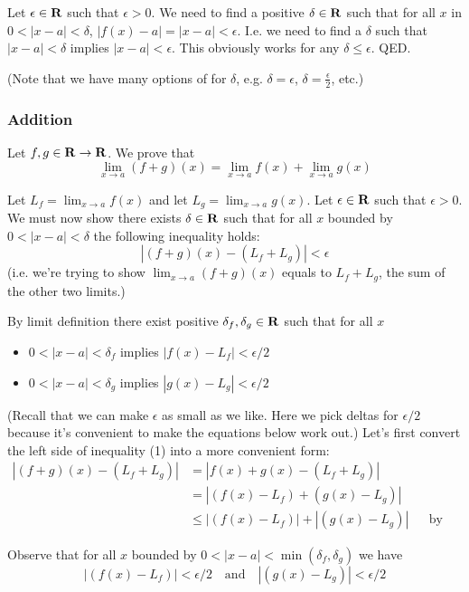 \vs

Let $\epsilon\in\mathbf{R}$ such that $\epsilon>0$. We need to find a positive $\delta\in\mathbf{R}$ such that for all $x$ in $0<|x-a|<\delta$, $|f(x)-a|=|x-a|<\epsilon$. I.e. we need to find a $\delta$ such that $|x-a|<\delta$ implies $|x-a|<\epsilon$. This obviously works for any $\delta\leq\epsilon$. QED.

\vs

(Note that we have many options of for $\delta$, e.g. $\delta=\epsilon$, $\delta=\frac{\epsilon}{2}$, etc.)

\subsubsection{Addition}
Let $f,g\in\mathbf{R}\to\mathbf{R}$. We prove that
\[\lim_{x\to a}(f+g)(x)=\lim_{x\to a}f(x)+\lim_{x\to a}g(x)\]

Let $L_f=\lim_{x\to a}f(x)$ and let $L_g=\lim_{x\to a}g(x)$. Let $\epsilon\in\mathbf{R}$ such that $\epsilon>0$. We must now show there exists $\delta\in\mathbf{R}$ such that for all $x$ bounded by $0<|x-a|<\delta$ the following inequality holds:
\begin{equation}
|(f+g)(x)-(L_f+L_g)|<\epsilon    
\end{equation}
(i.e. we're trying to show $\lim_{x\to a}(f+g)(x)$ equals to $L_f+L_g$, the sum of the other two limits.)

\vs

By limit definition there exist positive $\delta_f, \delta_g\in\mathbf{R}$ such that for all $x$
\begin{itemize}
    \item $0<|x-a|<\delta_f$ implies $|f(x)-L_f|<\epsilon/2$
    \item $0<|x-a|<\delta_g$ implies $|g(x)-L_g|<\epsilon/2$
\end{itemize}
(Recall that we can make $\epsilon$ as small as we like. Here we pick deltas for $\epsilon/2$ because it's convenient to make the equations below work out.) Let's first convert the left side of inequality (1) into a more convenient form:
\begin{align*}
    |(f+g)(x)-(L_f+L_g)|&=|f(x)+g(x)-(L_f+L_g)|\\
    &=|(f(x)-L_f)+(g(x)-L_g)|\\
    &\leq |(f(x)-L_f)|+|(g(x)-L_g)|&&\text{by triangle inequality}
\end{align*}

Observe that for all $x$ bounded by $0<|x-a|<\min(\delta_f, \delta_g)$ we have
\[|(f(x)-L_f)|<\epsilon/2 \ \ \ \text{ and }\ \ \  |(g(x)-L_g)|<\epsilon/2\]

